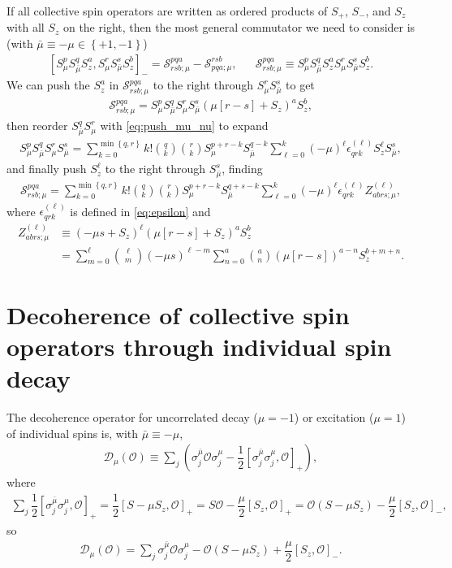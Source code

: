 \documentclass[aps,notitlepage,nofootinbib,11pt]{revtex4-1}
\newcommand{\f}[2]{\dfrac{#1}{#2}} %
\newcommand{\p}[1]{\left(#1\right)} %
\renewcommand{\sp}[1]{\left[#1\right]} %
\renewcommand{\set}[1]{\left\{#1\right\}} %
\newcommand{\D}{\mathcal{D}}
\renewcommand{\O}{\mathcal{O}}
\renewcommand{\S}{\mathcal{S}}
\newcommand{\bmu}{{\bar\mu}}
\newcommand{\1}{\mathds{1}}
\begin{document}
If all collective spin operators are written as ordered products of
$S_+$, $S_-$, and $S_z$ with all $S_z$ on the right, then the most
general commutator we need to consider is (with
$\bmu\equiv-\mu\in\set{+1,-1}$)
\begin{align}
  \sp{S_\mu^p S_\bmu^q S_z^a, S_\mu^r S_\bmu^s S_z^b}_-
  = \S^{pqa}_{rsb;\mu} - \S^{rsb}_{pqa;\mu},
  &&
  \S^{pqa}_{rsb;\mu}
  \equiv S_\mu^p S_\bmu^q S_z^a S_\mu^r S_\bmu^s S_z^b.
\end{align}
We can push the $S_z^a$ in $\S^{pqa}_{rsb;\mu}$ to the right through
$S_\mu^r S_\bmu^s$ to get
\begin{align}
  \S^{pqa}_{rsb;\mu}
  = S_\mu^p S_\bmu^q S_\mu^r S_\bmu^s  \p{\mu\sp{r-s}+S_z}^a S_z^b,
\end{align}
then reorder $S_\bmu^q S_\mu^r$ with \eqref{eq:push_mu_nu} to expand
\begin{align}
  S_\mu^p S_\bmu^q S_\mu^r S_\bmu^s
  = \sum_{k=0}^{\min\set{q,r}}
  k! { q \choose k } { r \choose k } S_\mu^{p+r-k} S_\bmu^{q-k}
  \sum_{\ell=0}^k \p{-\mu}^\ell \epsilon_{qrk}^{(\ell)}
  S_z^\ell S_\bmu^s,
\end{align}
and finally push $S_z^\ell$ to the right through $S_\bmu^s$, finding
\begin{align}
  \S^{pqa}_{rsb;\mu}
  = \sum_{k=0}^{\min\set{q,r}} k! { q \choose k } { r \choose k }
  S_\mu^{p+r-k} S_\bmu^{q+s-k}
  \sum_{\ell=0}^k \p{-\mu}^\ell \epsilon_{qrk}^{(\ell)}
  Z_{abrs;\mu}^{(\ell)},
\end{align}
where $\epsilon_{qrk}^{(\ell)}$ is defined in \eqref{eq:epsilon} and
\begin{align}
  Z_{abrs;\mu}^{(\ell)}
  &\equiv \p{-\mu s+S_z}^\ell \p{\mu\sp{r-s}+S_z}^a S_z^b \\
  &= \sum_{m=0}^\ell { \ell \choose m } \p{-\mu s}^{\ell-m}
  \sum_{n=0}^a { a \choose n } \p{\mu\sp{r-s}}^{a-n} S_z^{b+m+n}.
\end{align}


\section{Decoherence of collective spin operators through individual
  spin decay}
\label{sec:decoherence}

The decoherence operator for uncorrelated decay ($\mu=-1$) or
excitation ($\mu=1$) of individual spins is, with $\bmu\equiv-\mu$,
\begin{align}
  \D_\mu\p{\O}
  \equiv \sum_j\p{\sigma_j^\bmu \O \sigma_j^\mu
    - \f12\sp{\sigma_j^\bmu \sigma_j^\mu,\O}_+},
\end{align}
where
\begin{align}
  \sum_j \f12\sp{\sigma_j^\bmu \sigma_j^\mu,\O}_+
  = \f12\sp{S-\mu S_z,\O}_+
  = S\O - \f{\mu}{2}\sp{S_z,\O}_+
  = \O\p{S-\mu S_z} - \f{\mu}{2}\sp{S_z,\O}_-,
\end{align}
so
\begin{align}
  \D_\mu\p{\O}
  = \sum_j \sigma_j^\bmu \O \sigma_j^\mu
  - \O\p{S - \mu S_z} + \f{\mu}{2} \sp{S_z,\O}_-.
\end{align}
\end{document}
